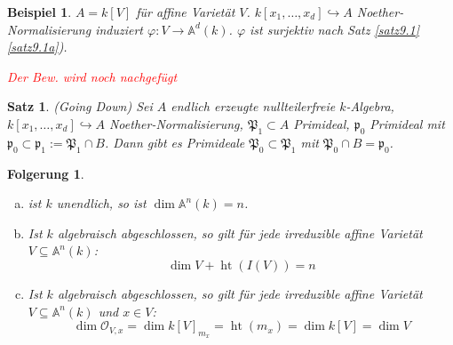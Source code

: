\documentclass[a4paper, 12pt, numbers=noendperiod, chapterprefix=true, headsepline]{scrbook}
\theoremstyle{break}
\newtheorem{UnterSatz}{Satz}[Satz]
\newtheorem{Folg}[Def]{Folgerung}
\theoremstyle{nonumberbreak}
\newtheorem{nnBsp}{Beispiel}
\theoremstyle{nonumberplain}
\newcommand{\quot}[1]{\textrm{\glqq}{#1}\textrm{\grqq}}
\DeclareMathOperator{\Ht}{ht}
\newcommand{\A}{\mathbb{A}}
\newcommand{\calO}{\mathcal{O}}
\begin{document}
\begin{nnBsp}
$A=k[V]$ f\"ur affine Variet\"at $V$. $k[x_1,\ldots ,x_d] \hookrightarrow A$ Noether-Normalisierung induziert $\varphi:V\to\A^d(k)$. $\varphi$ ist surjektiv nach Satz \ref{satz9.1} \ref{satz9.1a}).

\textcolor{red}{Der Bew. wird noch nachgef\"ugt}
\end{nnBsp}

\begin{UnterSatz}
(\quot{Going Down}) Sei $A$ endlich erzeugte nullteilerfreie $k$-Algebra, $k[x_1,\ldots ,x_d]\hookrightarrow A$ Noether-Normalisierung, $\mathfrak P_1\subset A$ Primideal, $\mathfrak p_0$ Primideal mit $\mathfrak p_0 \subset \mathfrak p_1 := \mathfrak P_1\cap B$. Dann gibt es Primideale $\mathfrak P_0\subset \mathfrak P_1$ mit $\mathfrak P_0\cap B=\mathfrak p_0$.
\begin{center}\end{center}
\end{UnterSatz}

\begin{Folg}\label{folg18.5}\begin{enumerate}[a)]
\item
	ist $k$ unendlich, so ist $\dim\A^n(k)=n$.
\item\label{folg18.5b}
	Ist $k$ algebraisch abgeschlossen, so gilt f\"ur jede irreduzible affine Variet\"at $V\subseteq\A^n(k)$:
		\[\dim V + \Ht(I(V))=n\]
\item\label{folg18.5c}
	Ist $k$ algebraisch abgeschlossen, so gilt f\"ur jede irreduzible affine Variet\"at $V\subseteq\A^n(k)$ und $x\in V$:
		\[\dim\calO_{V,x}=\dim k[V]_{m_x}=\Ht(m_x)=\dim k[V]=\dim V\]
\end{enumerate}\end{Folg}
\end{document}

